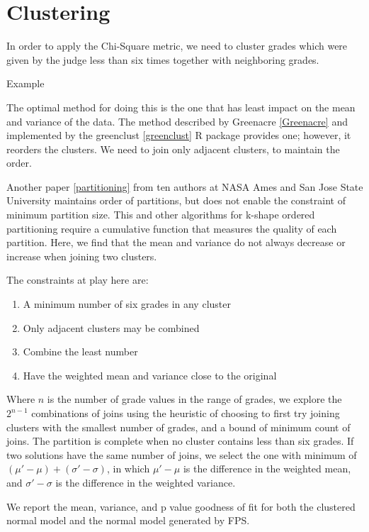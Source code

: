 \section{Clustering}

In order to apply the Chi-Square metric, we need to cluster grades which
were given by the judge less than six times together with neighboring
grades.

Example

The optimal method for doing this is the one that has least impact on
the mean and variance of the data. The method described by
Greenacre \ref{Greenacre}
and implemented by the
greenclust \ref{greenclust}
R package provides one; however, it reorders the clusters.
We need to join only adjacent clusters, to maintain the order.

Another paper
\ref {partitioning}
from ten authors at NASA Ames and San Jose State University
maintains order of partitions, but does not enable the constraint of
minimum partition size. This and other algorithms for k-shape
ordered partitioning require a cumulative
function that measures the quality of each partition.
Here, we find that the mean and variance do not always decrease or
increase when joining two clusters.

The constraints at play here are:
\begin{enumerate}
\item{A minimum number of six grades in any cluster}
\item{Only adjacent clusters may be combined}
\item{Combine the least number}
\item{Have the weighted mean and variance close to the original}
\end{enumerate}

Where $n$ is the number of grade values in the range of grades,
we explore the $2^{n-1}$ combinations of joins using the heuristic
of choosing to first try joining clusters with the smallest number of grades,
and a bound of minimum count of joins. The partition
is complete when no cluster contains less than six grades. If two solutions
have the same number of joins, we select the one with minimum of
$(\mu' - \mu) + (\sigma' - \sigma)$, in which
$\mu' - \mu$ is
the difference in the weighted mean, and
$\sigma' - \sigma$ is
the difference in the weighted variance.

We report the mean, variance, and p value goodness of fit
for both the clustered normal model and the normal model generated by FPS.

